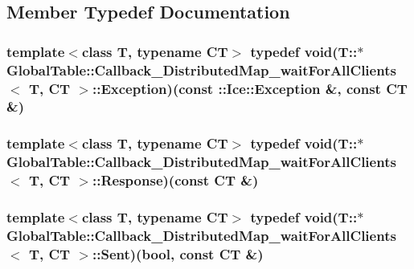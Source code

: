 \subsection{Member Typedef Documentation}
\hypertarget{class_global_table_1_1_callback___distributed_map__wait_for_all_clients_a1e030c06ca5740affedcffb34ba857fc}{
\subsubsection[{Exception}]{\setlength{\rightskip}{0pt plus 5cm}template$<$class T, typename CT$>$ typedef void(T::$\ast$ {\bf GlobalTable::Callback\_\-DistributedMap\_\-waitForAllClients}$<$ T, CT $>$::{\bf Exception})(const ::Ice::Exception \&, const CT \&)}}
\label{class_global_table_1_1_callback___distributed_map__wait_for_all_clients_a1e030c06ca5740affedcffb34ba857fc}
\hypertarget{class_global_table_1_1_callback___distributed_map__wait_for_all_clients_aba88f013404c18506ba6ad7bb0bf26bc}{
\subsubsection[{Response}]{\setlength{\rightskip}{0pt plus 5cm}template$<$class T, typename CT$>$ typedef void(T::$\ast$ {\bf GlobalTable::Callback\_\-DistributedMap\_\-waitForAllClients}$<$ T, CT $>$::{\bf Response})(const CT \&)}}
\label{class_global_table_1_1_callback___distributed_map__wait_for_all_clients_aba88f013404c18506ba6ad7bb0bf26bc}
\hypertarget{class_global_table_1_1_callback___distributed_map__wait_for_all_clients_ae931e7cc8794e1f268b0cc30db99f3d6}{
\subsubsection[{Sent}]{\setlength{\rightskip}{0pt plus 5cm}template$<$class T, typename CT$>$ typedef void(T::$\ast$ {\bf GlobalTable::Callback\_\-DistributedMap\_\-waitForAllClients}$<$ T, CT $>$::{\bf Sent})(bool, const CT \&)}}
